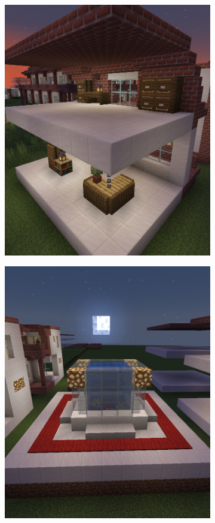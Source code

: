 \documentclass[
oneside,
fontsize=11pt
]{scrartcl}
\begin{document}
\begin{figure}[ht]
\begin{subfigure}[t]{0.3\textwidth}
      \includegraphics[width=\textwidth]{images/interior/middle-decoration-desks.png}
  \end{subfigure}
  \hfill
  \begin{subfigure}[t]{0.3\textwidth}
      \includegraphics[width=\textwidth]{images/interior/center-aquarium.png}

\end{subfigure}
\end{figure}
\end{document}
